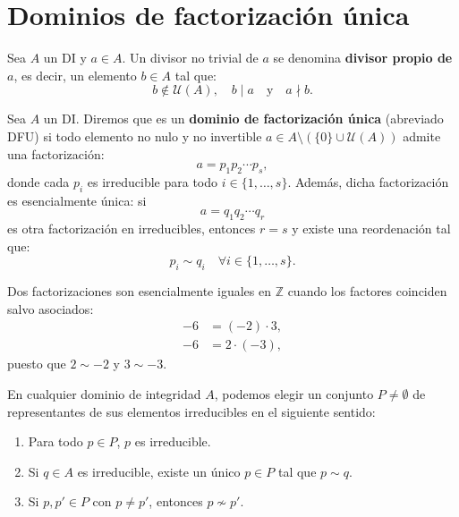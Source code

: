 \chapter{Dominios de factorización única}

\begin{definicion}
    Sea $A$ un DI y $a \in A$. Un divisor no trivial de $a$ se denomina \textbf{divisor propio de $a$}, es decir, un elemento $b \in A$ tal que:
    \[
        b \notin \mathcal{U}(A), \quad b \mid a \quad \text{y} \quad a \nmid b.
    \]
\end{definicion}

\begin{definicion}
    Sea $A$ un DI. Diremos que es un \textbf{dominio de factorización única} (abreviado DFU) si todo elemento no nulo y no invertible $a \in A \setminus (\{0\} \cup \mathcal{U}(A))$ admite una factorización:
    \[
        a = p_1 p_2 \cdots p_s,
    \]
    donde cada $p_i$ es irreducible para todo $i \in \{1, \dots, s\}$. Además, dicha factorización es esencialmente única: si
    \[
        a = q_1 q_2 \cdots q_r
    \]
    es otra factorización en irreducibles, entonces $r = s$ y existe una reordenación tal que:
    \[
        p_i \sim q_i \quad \forall i \in \{1, \dots, s\}.
    \]
\end{definicion}

\begin{ejemplo}
    Dos factorizaciones son esencialmente iguales en $\mathbb{Z}$ cuando los factores coinciden salvo asociados:
    \begin{align*}
        -6 &= (-2) \cdot 3, \\
        -6 &= 2 \cdot (-3),
    \end{align*}
    puesto que $2 \sim -2$ y $3 \sim -3$.
\end{ejemplo}

En cualquier dominio de integridad $A$, podemos elegir un conjunto $P \neq \emptyset$ de representantes de sus elementos irreducibles en el siguiente sentido:
\begin{enumerate}[label=\arabic*)]
    \item Para todo $p \in P$, $p$ es irreducible.
    \item Si $q \in A$ es irreducible, existe un único $p \in P$ tal que $p \sim q$.
    \item Si $p, p' \in P$ con $p \neq p'$, entonces $p \not\sim p'$.
\end{enumerate}

